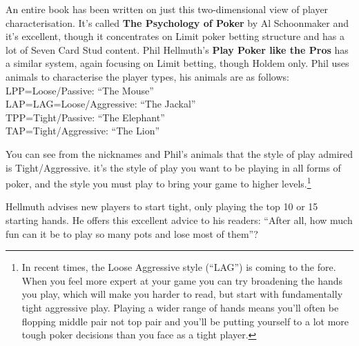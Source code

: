 
An entire book has been written on just this two-dimensional view
of player characterisation. It's called \textbf{The Psychology of Poker}
by Al Schoonmaker and it's excellent, though it concentrates
on Limit poker betting structure and has a lot of Seven Card Stud
content. Phil Hellmuth's \textbf{Play Poker like the Pros} has a
similar system, again focusing on Limit betting, though Holdem only.
Phil uses animals to characterise the player types, his animals are
as follows: \\
LPP=Loose/Passive: ``The Mouse'' \\
LAP=LAG=Loose/Aggressive: ``The Jackal'' \\
TPP=Tight/Passive: ``The Elephant'' \\
TAP=Tight/Aggressive: ``The Lion''


You can see from the nicknames and Phil's animals that the style
of play admired is Tight/Aggressive. it's the style of play you want
to be playing in all forms of poker, and the style you must play to
bring your game to higher
levels.\footnote{In recent times, the Loose Aggressive style
(``LAG'') is coming to the fore. When you feel more expert
at your game you can try broadening the hands you play, which
will make you harder to read, but start with fundamentally
tight aggressive play. Playing a wider range of hands means you'll
often be flopping middle pair not top pair and you'll be putting
yourself to a lot more tough poker decisions than you face as a tight
player.}

Hellmuth advises new players to start tight, only playing the
top 10 or 15 starting hands. He offers this excellent
advice to his readers: ``After all, how much fun can it be to
play so many pots and lose most of them''?


